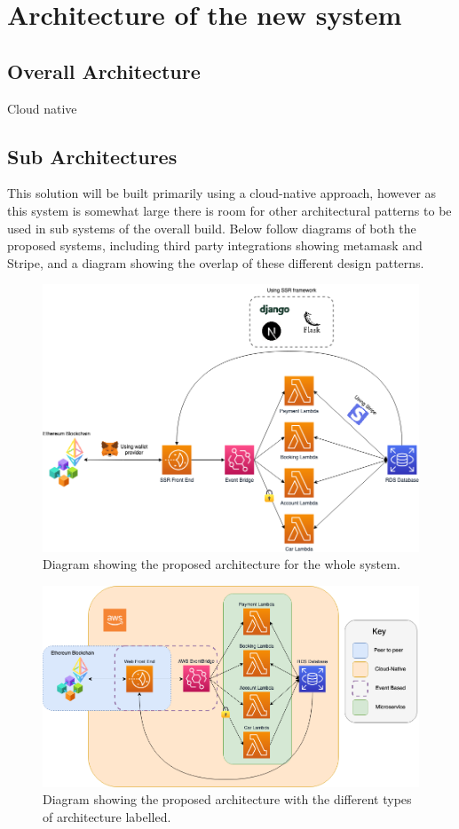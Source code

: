 \section{Architecture of the new system}

  \subsection{Overall Architecture}
  Cloud native

  \subsection{Sub Architectures}
  This solution will be built primarily using a cloud-native approach, however as this system is somewhat large there is room for other 
  architectural patterns to be used in sub systems of the overall build. Below follow diagrams of both the proposed systems, including third party 
  integrations showing metamask and Stripe, and a diagram showing the overlap of these different design patterns.

  \begin{figure}[H]
    \centering
    \includegraphics[width=12cm]{assets/architectureEvents.drawio.png}
    \caption{Diagram showing the proposed architecture for the whole system.}
    \label{fig:architecture}
  \end{figure}  

  \begin{figure}[H]
    \centering
    \includegraphics[width=12cm]{assets/architectureSectionedEvents.drawio.png}
    \caption{Diagram showing the proposed architecture with the different types of architecture labelled.}
    \label{fig:architectureSectioned}
  \end{figure}  

